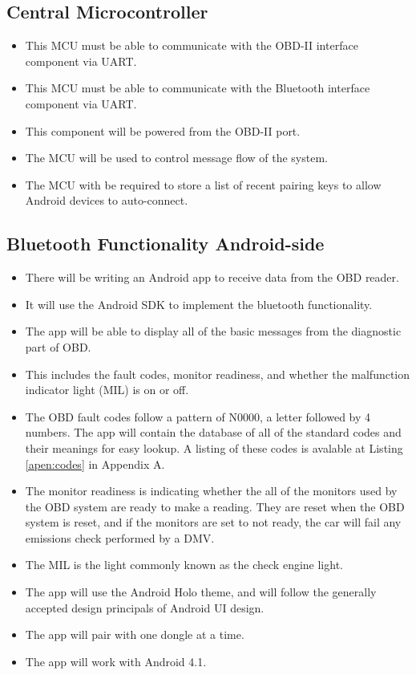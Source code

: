 \documentclass[12pt,letterpaper]{article}
\begin{document}
\subsection{Central Microcontroller}
\begin{itemize}
	\item This MCU must be able to communicate with the OBD-II interface component via UART.
	\item This MCU must be able to communicate with the Bluetooth interface component via UART.
	\item This component will be powered from the OBD-II port.
	\item The MCU will be used to control message flow of the system.
	\item The MCU with be required to store a list of recent pairing keys to allow Android devices to auto-connect.
\end{itemize} 

\subsection{Bluetooth Functionality Android-side}
\begin{itemize}
	\item There will be writing an Android app to receive data from the OBD reader.
	\item It will use the Android SDK to implement the bluetooth functionality.
	\item The app will be able to display all of the basic messages from the diagnostic part of OBD.
	\item This includes the fault codes, monitor readiness, and whether the malfunction indicator light (MIL) is on or off.
	\item The OBD fault codes follow a pattern of N0000, a letter followed by 4 numbers. The app will contain the database of all of the standard codes and their meanings for easy lookup. A listing of these codes is avalable at Listing \ref{apen:codes} in Appendix A.
	\item  The monitor readiness is indicating whether the all of the monitors used by the OBD system are ready to make a reading. They are reset when the OBD system is reset, and if the monitors are set to not ready, the car will fail any emissions check performed by a DMV. 
	\item The MIL is the light commonly known as the check engine light. 
	\item The app will use the Android Holo theme, and will follow the generally accepted design principals of Android UI design.
	\item The app will pair with one dongle at a time.
	\item The app will work with Android 4.1.

\end{itemize}
\end{document}
